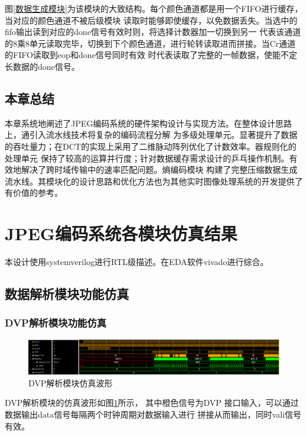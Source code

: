 \documentclass{article}
\numberwithin {equation}{section}
\begin{document}
\begin{spacing}{1.25}
    图\ref{数据生成模块}为该模块的大致结构。每个颜色通道都是用一个FIFO进行缓存，当对应的颜色通道不被后级模块
    读取时能够即使缓存，以免数据丢失。当选中的fifo输出读到对应的done信号有效时则，将选择计数器加一切换到另一
    代表该通道的8乘8单元读取完毕，切换到下个颜色通道，进行轮转读取进而拼接。当Cr通道的FIFO读取到eop和done信号同时有效
    时代表读取了完整的一帧数据，使能不定长数据的done信号。

  \subsection{本章总结}
    \vspace{1em}
    本章系统地阐述了JPEG编码系统的硬件架构设计与实现方法。在整体设计思路上，通引入流水线技术将复杂的编码流程分解
    为多级处理单元。显著提升了数据的吞吐量力；在DCT的实现上采用了二维脉动阵列优化了计数效率。器规则化的处理单元
    保持了较高的运算并行度；针对数据缓存需求设计的乒乓操作机制。有效地解决了跨时域传输中的速率匹配问题。熵编码模块
    构建了完整压缩数据生成流水线。其模块化的设计思路和优化方法也为其他实时图像处理系统的开发提供了有价值的参考。
  

\newpage
\section{JPEG编码系统各模块仿真结果}
  \vspace{1em}
  本设计使用systemverilog进行RTL级描述。在EDA软件vivado进行综合。
  \subsection{数据解析模块功能仿真}
    \vspace{1em}
    \subsubsection{DVP解析模块功能仿真}
      \vspace{1em}
      \begin{figure}[H]
        \centering
        \includegraphics[scale=0.25]{./pictures/DVP_simwave.png}
        \caption{DVP解析模块仿真波形}
        \label{DVPSimWave}
      \end{figure}
      DVP解析模块的仿真波形如图\ref{DVPSimWave}所示， 其中橙色信号为DVP
      接口输入，可以通过数据输出data信号每隔两个时钟周期对数据输入进行
      拼接从而输出，同时vali信号有效。

\end{spacing}
\end{document}
